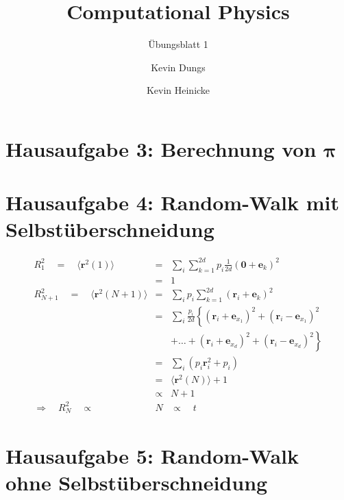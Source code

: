 \documentclass{scrartcl}
\author{Kevin Dungs \and Kevin Heinicke}
\title{Computational Physics}
\subtitle{Übungsblatt 1}
\renewcommand{\vec}[1]{\mathbf{#1}}
\begin{document}
\maketitle

\section*{Hausaufgabe 3: Berechnung von $\mathbf{\pi}$} 

\section*{Hausaufgabe 4: Random-Walk mit Selbstüberschneidung}
    \begin{eqnarray*}
        R_1^2 \quad = \quad \langle \vec{r}^2(1) \rangle & = & \sum_i \sum_{k=1}^{2d} p_i \frac{1}{2d}\left(\vec{0} + \vec{e}_k \right)^2 \\
        & = & 1 \\
        R_{N+1}^2 \quad = \quad \langle \vec{r}^2(N+1) \rangle & = & \sum_i p_i \sum_{k=1}^{2d} \left( \vec{r}_i + \vec{e}_k \right)^2 \\
                                                               & = & \sum_i \frac{p_i}{2d} \left\{ \left( \vec{r}_i + \vec{e}_{x_1} \right)^2 + \left( \vec{r}_i - \vec{e}_{x_1} \right)^2 \right. \\ 
                                                               & & \left. + \dots + \left( \vec{r}_i + \vec{e}_{x_d} \right)^2 + \left( \vec{r}_i - \vec{e}_{x_d} \right)^2 \right\} \\
                                                               & = & \sum_i \left( p_i \vec{r}_i^2 + p_i \right) \\
                                                               & = & \langle \vec{r}^2(N) \rangle + 1 \\
                                                               & \propto & N + 1 \\
        \Rightarrow \quad R_N^2 \quad \propto & N & \propto \quad t
    \end{eqnarray*}


\section*{Hausaufgabe 5: Random-Walk ohne Selbstüberschneidung}
\end{document}
